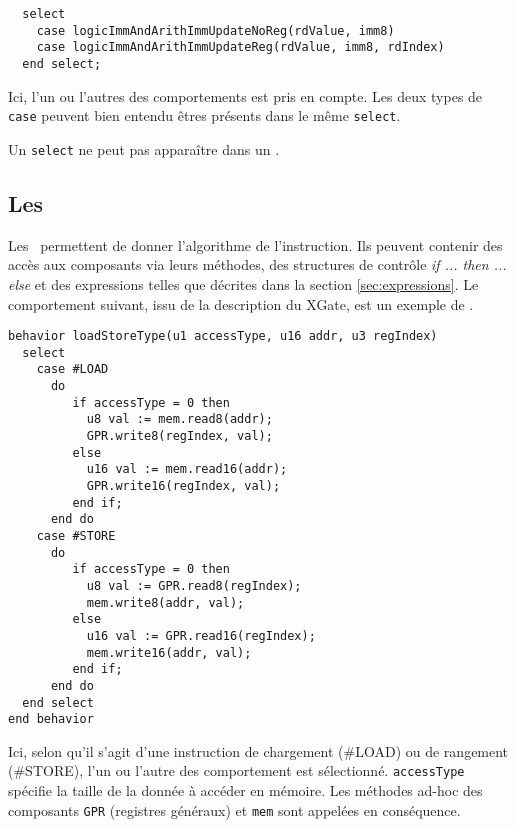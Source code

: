 \begin{lstlisting}
  select
    case logicImmAndArithImmUpdateNoReg(rdValue, imm8)
    case logicImmAndArithImmUpdateReg(rdValue, imm8, rdIndex)
  end select;
\end{lstlisting}
Ici, l'un ou l'autres des comportements est pris en compte. Les deux types de {\tt case} peuvent bien entendu êtres présents dans le même {\tt select}.

Un {\tt select} ne peut pas apparaître dans un \blocdo.

\subsection{Les \blocsdo}
\label{sec:behDo}

Les \blocsdo\ permettent de donner l'algorithme de l'instruction. Ils peuvent contenir des accès aux composants via leurs méthodes, des structures de contrôle {\em if ... then ... else} et des expressions telles que décrites dans la section \ref{sec:expressions}. Le comportement suivant, issu de la description du XGate, est un exemple de \blocdo. 
\begin{lstlisting}
behavior loadStoreType(u1 accessType, u16 addr, u3 regIndex)
  select
    case #LOAD
      do
         if accessType = 0 then
           u8 val := mem.read8(addr);
           GPR.write8(regIndex, val);
         else
           u16 val := mem.read16(addr);
           GPR.write16(regIndex, val);
         end if;
      end do
    case #STORE 
      do
         if accessType = 0 then
           u8 val := GPR.read8(regIndex);
           mem.write8(addr, val);
         else
           u16 val := GPR.read16(regIndex);
           mem.write16(addr, val);
         end if;
      end do
  end select
end behavior
\end{lstlisting}
Ici, selon qu'il s'agit d'une instruction de chargement (\#LOAD) ou de rangement (\#STO\-RE), l'un ou l'autre des comportement est sélectionné. {\tt accessType} spécifie la taille de la donnée à accéder en mémoire. Les méthodes ad-hoc des composants {\tt GPR} (registres généraux) et {\tt mem} sont appelées en conséquence.

